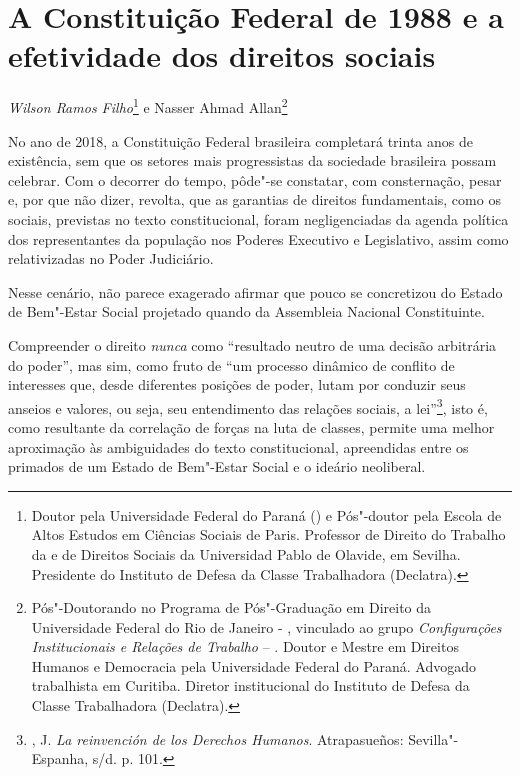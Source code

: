 \chapter*{A Constituição Federal de 1988 e a efetividade dos direitos sociais}


\begin{flushright}
\emph{Wilson Ramos Filho}\footnote{Doutor pela Universidade Federal do
  Paraná () e Pós"-doutor pela Escola de Altos Estudos em Ciências
  Sociais de Paris. Professor de Direito do Trabalho da  e de
  Direitos Sociais da Universidad Pablo de Olavide, em Sevilha.
  Presidente do Instituto de Defesa da Classe Trabalhadora (Declatra).}
e Nasser Ahmad Allan\footnote{Pós"-Doutorando no Programa de Pós"-Graduação
  em Direito da Universidade Federal do Rio de Janeiro - , vinculado
  ao grupo \emph{Configurações Institucionais e Relações de Trabalho} --
  . Doutor e Mestre em Direitos Humanos e Democracia pela
  Universidade Federal do Paraná. Advogado trabalhista em Curitiba.
  Diretor institucional do Instituto de Defesa da Classe Trabalhadora
  (Declatra).}
\end{flushright}

No ano de 2018, a Constituição Federal brasileira completará trinta anos
de existência, sem que os setores mais progressistas da sociedade
brasileira possam celebrar. Com o decorrer do tempo, pôde"-se constatar,
com consternação, pesar e, por que não dizer, revolta, que as garantias
de direitos fundamentais, como os sociais, previstas no texto
constitucional, foram negligenciadas da agenda política dos
representantes da população nos Poderes Executivo e Legislativo, assim
como relativizadas no Poder Judiciário.

Nesse cenário, não parece exagerado afirmar que pouco se concretizou do
Estado de Bem"-Estar Social projetado quando da Assembleia Nacional
Constituinte.

Compreender o direito \emph{nunca} como ``resultado neutro de uma
decisão arbitrária do poder'', mas sim, como fruto de ``um processo
dinâmico de conflito de interesses que, desde diferentes posições de
poder, lutam por conduzir seus anseios e valores, ou seja, seu
entendimento das relações sociais, a lei''\footnote{, J.
  \emph{La reinvención de los Derechos Humanos}. Atrapasueños:
  Sevilla"-Espanha, s/d. p. 101.}, isto é, como resultante da correlação
de forças na luta de classes, permite uma melhor aproximação às
ambiguidades do texto constitucional, apreendidas entre os primados de
um Estado de Bem"-Estar Social e o ideário neoliberal.

